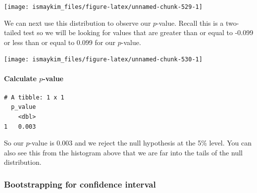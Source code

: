 \documentclass[12pt, krantz2,]{krantz}
\makeatletter
\newenvironment{Shaded}{\begin{snugshade}}{\end{snugshade}}
\newcommand{\DataTypeTok}[1]{\textcolor[rgb]{0.27,0.27,0.27}{#1}}
\newcommand{\KeywordTok}[1]{\textcolor[rgb]{0.27,0.27,0.27}{\textbf{#1}}}
\newcommand{\NormalTok}[1]{#1}
\newcommand{\OperatorTok}[1]{\textcolor[rgb]{0.43,0.43,0.43}{\textbf{#1}}}
\newcommand{\StringTok}[1]{\textcolor[rgb]{0.5,0.5,0.5}{#1}}
\let\oldparagraph\paragraph
\renewcommand{\paragraph}[1]{\oldparagraph{#1}\mbox{}}
\newenvironment{kframe}{%
\medskip{}
\setlength{\fboxsep}{.8em}
 \def\at@end@of@kframe{}%
 \ifinner\ifhmode%
  \def\at@end@of@kframe{\end{minipage}}%
  \begin{minipage}{\columnwidth}%
 \fi\fi%
 \def\FrameCommand##1{\hskip\@totalleftmargin \hskip-\fboxsep
 \colorbox{shadecolor}{##1}\hskip-\fboxsep
     \hskip-\linewidth \hskip-\@totalleftmargin \hskip\columnwidth}%
 \MakeFramed {\advance\hsize-\width
   \@totalleftmargin\z@ \linewidth\hsize
   \@setminipage}}%
 {\par\unskip\endMakeFramed%
 \at@end@of@kframe}
\renewenvironment{Shaded}{\begin{kframe}}{\end{kframe}}
\makeatother
\begin{document}
\begin{center}\texttt{[image: ismaykim\_files/figure-latex/unnamed-chunk-529-1]} \end{center}

We can next use this distribution to observe our \(p\)-value. Recall this is a two-tailed test so we will be looking for values that are greater than or equal to -0.099 or less than or equal to 0.099 for our \(p\)-value.

\begin{Shaded}
\end{Shaded}

\begin{center}\texttt{[image: ismaykim\_files/figure-latex/unnamed-chunk-530-1]} \end{center}

\hypertarget{calculate-p-value-2}{%
\paragraph{\texorpdfstring{Calculate \(p\)-value}{Calculate p-value}}\label{calculate-p-value-2}}

\begin{Shaded}
\end{Shaded}

\begin{verbatim}
# A tibble: 1 x 1
  p_value
    <dbl>
1   0.003
\end{verbatim}

So our \(p\)-value is 0.003 and we reject the null hypothesis at the 5\% level. You can also see this from the histogram above that we are far into the tails of the null distribution.

\hypertarget{bootstrapping-for-confidence-interval-2}{%
\subsubsection*{Bootstrapping for confidence interval}\label{bootstrapping-for-confidence-interval-2}}
\end{document}
